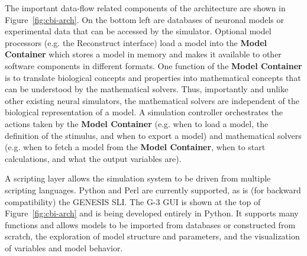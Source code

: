 \documentclass[10pt]{article}
\begin{document}
The important data-flow related components of the architecture are
shown in Figure~\ref{fig:cbi-arch}. On the bottom left are
databases of neuronal models or experimental data that can be accessed
by the simulator. Optional model processors (e.g. the Reconstruct
interface) load a model into the {\bf Model Container} which stores a
model in memory and makes it available to other software components in
different formats.  One function of the {\bf Model Container} is to
translate biological concepts and properties into mathematical
concepts that can be understood by the mathematical solvers. Thus,
importantly and unlike other existing neural simulators, the
mathematical solvers are independent of the biological representation
of a model. A simulation controller orchestrates the actions taken by
the {\bf Model Container} (e.g. when to load a model, the definition
of the stimulus, and when to export a model) and mathematical solvers
(e.g. when to fetch a model from the {\bf Model Container}, when to
start
calculations, and what the output variables are).


A scripting layer allows the simulation system to be driven from
multiple scripting languages. Python and Perl are currently supported,
as is (for backward compatibility) the GENESIS SLI. The G-3 GUI is shown at the top of
Figure~\ref{fig:cbi-arch} and is being developed entirely in Python.  It supports many functions and
allows models to be imported from databases or constructed from
scratch, the exploration of model structure and parameters, and the
visualization of variables and model behavior.
\end{document}
